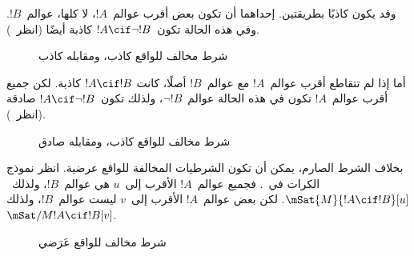 \documentclass[../../../include/open-logic-section]{subfiles}
\begin{document}
وقد يكون كاذبًا بطريقتين. إحداهما أن تكون بعض أقرب عوالم~$!A$،
لا كلها، عوالم~$!B$. وفي هذه الحالة تكون~$!A \cif \lnot !B$ كاذبة
أيضًا (انظر~).
\begin{figure}
\begin{center}
\caption{شرط مخالف للواقع كاذب، ومقابله كاذب}
\end{center}
\end{figure}
أما إذا لم تتقاطع أقرب عوالم~$!A$ مع عوالم~$!B$ أصلًا، كانت
$!A \cif !B$ كاذبة. لكن جميع أقرب عوالم~$!A$ تكون في هذه الحالة
عوالم~$\lnot !B$، ولذلك تكون~$!A \cif \lnot !B$ صادقة
(انظر~).
\begin{figure}
\begin{center}
\caption{شرط مخالف للواقع كاذب، ومقابله صادق}
\end{center}
\end{figure}

بخلاف الشرط الصارم، يمكن أن تكون الشرطيات المخالفة للواقع عرضية.
انظر نموذج الكرات في~. فجميع عوالم~$!A$ الأقرب
إلى~$u$ هي عوالم~$!B$، ولذلك~$\mSat{M}{!A \cif !B}[u]$.
لكن بعض عوالم~$!A$ الأقرب إلى~$v$ ليست عوالم~$!B$، ولذلك
$\mSat/{M}{!A \cif !B}[v]$.
\begin{figure}
\begin{center}
\end{center}
\caption{شرط مخالف للواقع عَرَضي}
\end{figure}
\end{document}
